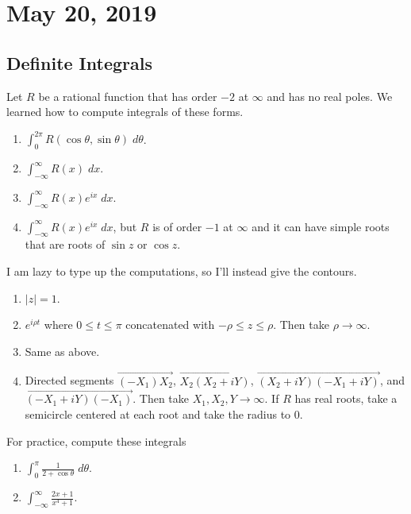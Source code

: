 \section{May 20, 2019}

\subsection{Definite Integrals}

Let $R$ be a rational function that has order $-2$ at $\infty$ and has
no real poles.
We learned how to compute integrals of these forms.
\begin{enumerate}
    \item $\int_0^{2\pi} R(\cos \theta, \sin \theta) \; d\theta$.
    \item $\int_{-\infty}^{\infty} R(x) \; dx$.
    \item $\int_{-\infty}^{\infty} R(x)e^{ix} \; dx$.
    \item $\int_{-\infty}^{\infty} R(x)e^{ix} \; dx$, but $R$
        is of order $-1$ at $\infty$ and it can have simple roots
        that are roots of $\sin z$ or $\cos z$.
\end{enumerate}

I am lazy to type up the computations, so I'll instead  give the contours.
\begin{enumerate}
    \item $|z| = 1$.
    \item $e^{i\rho t}$ where $0 \le t \le \pi$ concatenated with
        $-\rho \le z \le \rho$.
        Then take $\rho \to \infty$.
    \item Same as above.
    \item Directed segments $\overrightarrow{(-X_1)X_2}$, $\overrightarrow{X_2(X_2+iY)}$,
        $\overrightarrow{(X_2+iY)(-X_1+iY)}$, and $\overrightarrow{(-X_1+iY)(-X_1)}$.
        Then take $X_1, X_2, Y \to \infty$.
        If $R$ has real roots, take a semicircle centered at each root and take the radius
        to $0$.
\end{enumerate}

For practice, compute these integrals
\begin{enumerate}
    \item $ \int_0^{\pi} \frac{1}{2 + \cos \theta} \; d\theta$.
    \item $ \int_{-\infty}^{\infty} \frac{2x + 1}{x^4 + 1}$.
\end{enumerate}
